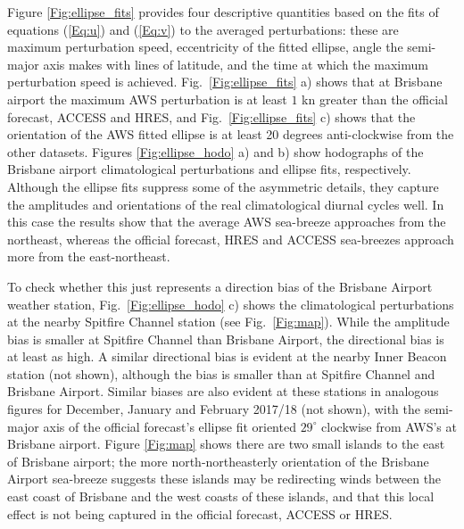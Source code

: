 \documentclass{ametsoc}
\begin{document}
Figure \ref{Fig:ellipse_fits} provides four descriptive quantities based on the fits of equations (\ref{Eq:u}) and (\ref{Eq:v}) to the averaged perturbations: these are maximum perturbation speed, eccentricity of the fitted ellipse, angle the semi-major axis makes with lines of latitude, and the time at which the maximum perturbation speed is achieved. Fig.~\ref{Fig:ellipse_fits} a) shows that at Brisbane airport the maximum AWS perturbation is at least $1$ kn greater than the official forecast, ACCESS and HRES, and Fig.~\ref{Fig:ellipse_fits} c) shows that the orientation of the AWS fitted ellipse is at least 20 degrees anti-clockwise from the other datasets. Figures \ref{Fig:ellipse_hodo} a) and b) show hodographs of the Brisbane airport climatological perturbations and ellipse fits, respectively. Although the ellipse fits suppress some of the asymmetric details, they capture the amplitudes and orientations of the real climatological diurnal cycles well. In this case the results show that the average AWS sea-breeze approaches from the northeast, whereas the official forecast, HRES and ACCESS sea-breezes approach more from the east-northeast. 

To check whether this just represents a direction bias of the Brisbane Airport weather station, Fig.~\ref{Fig:ellipse_hodo} c) shows the climatological perturbations at the nearby Spitfire Channel station (see Fig.~\ref{Fig:map}). While the amplitude bias is smaller at Spitfire Channel than Brisbane Airport, the directional bias is at least as high. A similar directional bias is evident at the nearby Inner Beacon station (not shown), although the bias is smaller than at Spitfire Channel and Brisbane Airport. Similar biases are also evident at these stations in analogous figures for December, January and February 2017/18 (not shown), with the semi-major axis of the official forecast's ellipse fit oriented $29^\circ$ clockwise from AWS's at Brisbane airport. Figure \ref{Fig:map} shows there are two small islands to the east of Brisbane airport; the more north-northeasterly orientation of the Brisbane Airport sea-breeze suggests these islands may be redirecting winds between the east coast of Brisbane and the west coasts of these islands, and that this local effect is not being captured in the official forecast, ACCESS or HRES. 
\end{document}

